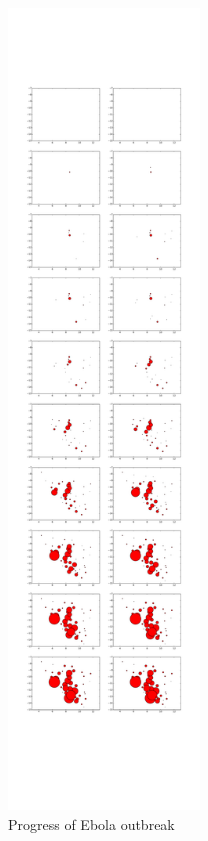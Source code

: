 \documentclass[12pt]{article}
\begin{document}
\begin{figure}[hbt]
\begin{center}
  \includegraphics[width=2in]{graph/evlvo.pdf}
  \caption{Progress of Ebola outbreak}
\end{center}  
\end{figure}
\end{document}
